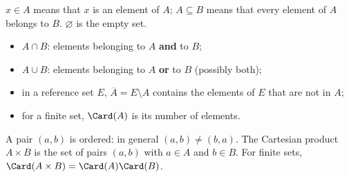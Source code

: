 \begin{cours}
$x\in A$ means that $x$ is an element of $A$; $A\subseteq B$ means that every element of $A$ belongs to $B$. $\varnothing$ is the empty set.
\begin{itemize}
\item $A\cap B$: elements belonging to $A$ \textbf{and} to $B$;
\item $A\cup B$: elements belonging to $A$ \textbf{or} to $B$ (possibly both);
\item in a reference set $E$, $\overline A=E\setminus A$ contains the elements of $E$ that are not in $A$;
\item for a finite set, $\Card(A)$ is its number of elements.
\end{itemize}
\end{cours}
\begin{cours}
A pair $(a,b)$ is ordered: in general $(a,b)\ne(b,a)$. The Cartesian product $A\times B$ is the set of pairs $(a,b)$ with $a\in A$ and $b\in B$. For finite sets, $\Card(A\times B)=\Card(A)\Card(B)$.
\end{cours}


